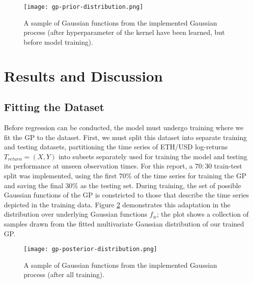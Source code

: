 \documentclass[a4paper, 11pt]{article}
\begin{document}
    \begin{figure}[ht]
        \centering
        \caption{\centering A sample of Gaussian functions from the implemented Gaussian process (after hyperparameter of the kernel have been learned, but before model training).}
        \texttt{[image: gp-prior-distribution.png]}
        \label{fig:prior-dist}
    \end{figure}

    \section{Results and Discussion}

    \subsection{Fitting the Dataset}

    Before regression can be conducted, the model must undergo training where we fit the GP to the dataset. First, we must split this dataset into separate training and testing datasets, partitioning the time series of ETH/USD log-returns $T_{return} = (X, Y)$ into subsets separately used for training the model and testing its performance at unseen observation times. For this report, a $70:30$ train-test split was implemented, using the first $70\%$ of the time series for training the GP and saving the final $30\%$ as the testing set. During training, the set of possible Gaussian functions of the GP is constricted to those that describe the time series depicted in the training data. Figure \ref{fig:posterior} demonstrates this adaptation in the distribution over underlying Gaussian functions $f_w$; the plot shows a collection of samples drawn from the fitted multivariate Gaussian distribution of our trained GP.

    \begin{figure}[ht]
        \centering
        \caption{\centering A sample of Gaussian functions from the implemented Gaussian process (after all training).}
        \texttt{[image: gp-posterior-distribution.png]}
        \label{fig:posterior}
    \end{figure}
\end{document}
